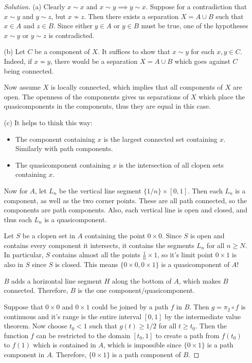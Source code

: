 \documentclass{article}
\theoremstyle{definition}
\begin{document}
\begin{proof}[Solution]
  (a) Clearly $x\sim x$ and $x\sim y\implies y\sim x$. Suppose for a contradiction that $x\sim y$ and $y\sim z$, but $x\not\sim z$. Then there exists a separation $X = A\cup B$ such that $x\in A$ and $z\in B$. Since either $y\in A$ or $y\in B$ must be true, one of the hypotheses $x\sim y$ or $y\sim z$ is contradicted.

  (b) Let $C$ be a component of $X$. It suffices to show that $x\sim y$ for each $x,y\in C$. Indeed, if $x\not\sim y$, there would be a separation $X = A\cup B$ which goes against $C$ being connected.

  Now assume $X$ is locally connected, which implies that all components of $X$ are open. The openness of the components gives us separations of $X$ which place the quasicomponents in the components, thus they are equal in this case.

  (c) It helps to think this way:
  \begin{itemize}
    \item The component containing $x$ is the largest connected set containing $x$. Similarly with path components.
    \item The quasicomponent containing $x$ is the intersection of all clopen sets containing $x$.
  \end{itemize}

  Now for $A$, let $L_n$ be the vertical line segment $\{1/n\}\times[0,1]$. Then each $L_n$ is a component, as well as the two corner points. These are all path connected, so the components are path components. Also, each vertical line is open and closed, and thus each $L_n$ is a quasicomponent.

  Let $S$ be a clopen set in $A$ containing the point $0\times 0$. Since $S$ is open and contains every component it intersects, it contains the segments $L_n$ for all $n\ge N$. In particular, $S$ contains almost all the points $\frac{1}{n}\times 1$, so it's limit point $0\times 1$ is also in $S$ since $S$ is closed. This means $\{0\times 0,0\times 1\}$ is a quasicomponent of $A$!

  $B$ adds a horizontal line segment $H$ along the bottom of $A$, which makes $B$ connected. Therefore, $B$ is the one component/quasicomponent.

  Suppose that $0\times 0$ and $0\times 1$ could be joined by a path $f$ in $B$. Then $g = \pi_2\circ f$ is continuous and it's range is the entire interval $[0,1]$ by the intermediate value theorem. Now choose $t_0<1$ such that $g(t)\ge 1/2$ for all $t\ge t_0$. Then the function $f$ can be restricted to the domain $[t_0,1]$ to create a path from $f(t_0)$ to $f(1)$ which is contained in $A$, which is impossible since $\{0\times 1\}$ is a path component in $A$. Therefore, $\{0\times 1\}$ is a path component of $B$.


\end{proof}
\end{document}
